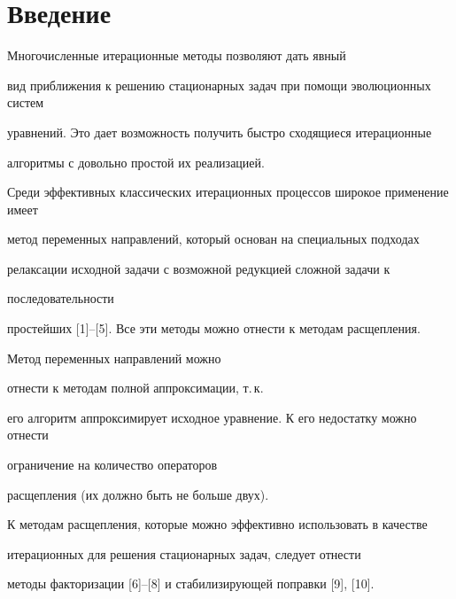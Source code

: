 

\maketitle


\label{begin}











\section*{Введение}





Многочисленные итерационные методы позволяют дать явный 


вид приближения к решению стационарных задач при помощи эволюционных систем   


уравнений. Это дает возможность получить быстро сходящиеся итерационные


алгоритмы с довольно простой их реализацией.





Среди эффективных классических итерационных процессов широкое применение имеет 


метод переменных направлений, который основан на специальных подходах 


релаксации исходной задачи с возможной редукцией сложной задачи к 


последовательности


простейших [1]--[5]. Все эти методы можно отнести к методам расщепления.


Метод переменных направлений можно 


отнести к методам полной аппроксимации, т.\,к.


его алгоритм аппроксимирует исходное уравнение. К его недостатку можно отнести 


ограничение на количество операторов 


расщепления (их должно быть не больше двух).


К методам расщепления, которые можно эффективно использовать в качестве 


итерационных для решения стационарных задач, следует отнести


методы факторизации [6]--[8] и стабилизирующей поправки [9], [10]. 


